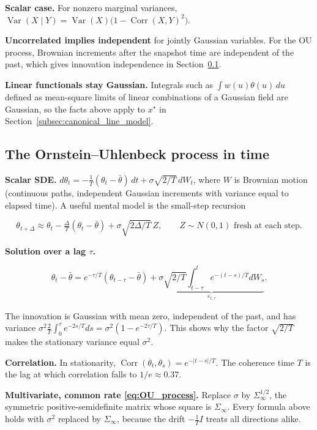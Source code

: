 \textbf{Scalar case.} For nonzero marginal variances, $\operatorname{Var}(X\mid Y)=\operatorname{Var}(X)\big(1-\operatorname{Corr}(X,Y)^2\big)$.

\textbf{Uncorrelated implies independent} for jointly Gaussian variables. For the OU process, Brownian increments after the snapshot time are independent
of the past, which gives innovation independence in Section~\ref{app:toolkit-4}.

\textbf{Linear functionals stay Gaussian.} Integrals such as $\int w(u)\theta(u)\,du$ defined as mean-square limits of linear combinations of a Gaussian field are Gaussian, so the facts above apply to $x^\star$ in Section~\ref{subsec:canonical_line_model}.

\subsection{The Ornstein--Uhlenbeck process in time}
\label{app:toolkit-4}
\textbf{Scalar SDE.} $d\theta_t=-\tfrac1T(\theta_t-\bar\theta)\,dt+\sigma\sqrt{2/T}\,dW_t$, where $W$ is Brownian motion (continuous paths, independent Gaussian increments with variance equal to elapsed time). A useful mental model is the small-step recursion

\[
\theta_{t+\Delta}\approx\theta_t-\tfrac{\Delta}{T}(\theta_t-\bar\theta)+\sigma\sqrt{2\Delta/T}\,Z,\qquad Z\sim N(0,1)\text{ fresh at each step}.
\]

\textbf{Solution over a lag $\tau$.}

\[
\theta_t-\bar\theta=e^{-\tau/T}(\theta_{t-\tau}-\bar\theta)+\underbrace{\sigma\sqrt{2/T}\int_{t-\tau}^{t}e^{-(t-s)/T}dW_s}_{\varepsilon_{t,\tau}} .
\]

  The innovation is Gaussian with mean zero, independent of the past, and has variance $\sigma^2\tfrac2T\int_0^\tau e^{-2s/T}ds=\sigma^2(1-e^{-2\tau/T})$. This shows why the factor $\sqrt{2/T}$ makes the stationary variance equal $\sigma^2$.

\textbf{Correlation.} In stationarity, $\operatorname{Corr}(\theta_t,\theta_s)=e^{-|t-s|/T}$. The coherence time $T$ is the lag at which correlation falls to $1/e\approx0.37$.

\textbf{Multivariate, common rate \eqref{eq:OU_process}.} Replace $\sigma$ by $\Sigma_\infty^{1/2}$, the symmetric positive-semidefinite matrix whose square is $\Sigma_\infty$. Every formula above holds with $\sigma^2$ replaced by $\Sigma_\infty$, because the drift $-\tfrac1T I$ treats all directions alike.

